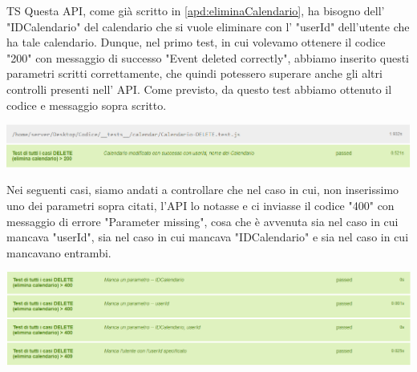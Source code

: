 \begin{listaPersonale}{TS}
                Questa API, come già scritto in \ref{apd:eliminaCalendario}, ha bisogno dell' "IDCalendario" del calendario che si vuole eliminare con l' "userId" dell'utente che ha tale calendario. Dunque, nel primo test, in cui volevamo ottenere il codice "200" con messaggio di successo "Event deleted correctly", abbiamo inserito questi parametri scritti correttamente, che quindi potessero superare anche gli altri controlli presenti nell' API. Come previsto, da questo test abbiamo ottenuto il codice e messaggio sopra scritto.
                \begin{center}
                        \includegraphics[width=1\textwidth, height=0.08\textheight]{img/png/tests/CalendarioDelete/200_deleteCalendario.png}
                \end{center}
                Nei seguenti casi, siamo andati a controllare che nel caso in cui, non inserissimo uno dei parametri sopra citati, l'API lo notasse e ci inviasse il codice "400" con messaggio di errore "Parameter missing", cosa che è avvenuta sia nel caso in cui mancava "userId", sia nel caso in cui mancava "IDCalendario" e sia nel caso in cui mancavano entrambi.
                \begin{center}
                        \includegraphics[width=1\textwidth, height=0.15\textheight]{img/png/tests/CalendarioDelete/400_missingParameter_deleteCalendario.png}
                \end{center}

\end{listaPersonale}
